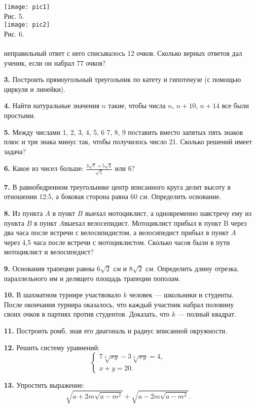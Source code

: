 \documentclass[../main.tex]{subfiles}
\begin{document}
\begin{multicols}{2}
\noindent\texttt{[image: pic1]} \\
Рис. 5. \\
\texttt{[image: pic2]} \\
Рис. 6. \\
\\
неправильный ответ с него списывалось 12 очков. Сколько верных ответов дал ученик, если он набрал 77 очков?
\par \textbf{3. } Построить прямоугольный треугольник по катету и гипотенузе (с помощью циркуля и линейки).
\par \textbf{4. } Найти натуральные значения $n$ такие, чтобы числа $n$, $n+10$, $n+14$ все были простыми.
\par \textbf{5. } Между числами 1, 2, 3, 4, 5, 6 7, 8, 9 поставить вместо запятых пять знаков плюс и три знака минус так, чтобы получилось число 21. Сколько решений имеет задача?
\par \textbf{6. } Какое из чисел больше: $\frac{3\sqrt{7}+5\sqrt{2}}{\sqrt{5}}$ или 6?
\par \textbf{7. } В равнобедренном треугольнике центр вписанного круга делит высоту в отношении 12:5, а боковая сторона равна 60 \textit{см}. Определить основание.
\par \textbf{8. } Из пункта $A$ в пункт $B$ выехал мотоциклист, а одновременно навстречу ему из пункта $B$ в пункт $A$выехал велосепидист. Мотоциклист прибыл в пункт B через два часа после встречи с велосипидистом, а велосипедист прибыл в пункт $A$ через 4,5 часа после встречи с мотоциклистом. Сколько часов были в пути мотоциклист и велосипедист?
\par \textbf{9. } Основания трапеции равны $6\sqrt{2}$ \textit{см} и $8\sqrt{2}$ \textit{см}. Определить длину отрезка, параллельного им и делящего площадь трапеции пополам.\
\par \textbf{10. } В шахматном турнире участвовало $k$ человек — школьники и студенты. После окончания турнира оказалось, что каждый участник набрал половину своих очков в партиях против студентов. Доказать, что $k$ — полный квадрат.
\par \textbf{11. } Построить ромб, зная его диагональ и радиус вписанной окружности.
\par \textbf{12. } Решить систему уравнений:
$$
\begin{cases}
7\sqrt[3]{xy}-3\sqrt[3]{xy}=4,
\\
x+y=20.
\end{cases}
$$
\par \textbf{13.} Упростить выражение:
$$
\sqrt{a+2m\sqrt{a-m^2}}+\sqrt{a-2m\sqrt{a-m^2}}.
$$
\\
\\
\\
\end{multicols}
\end{document}
